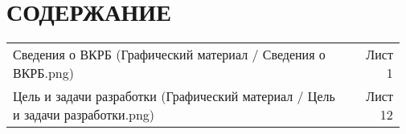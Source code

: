 \newpage
\section*{СОДЕРЖАНИЕ}
\tableofcontents
\vspace{3pt}
{\parindent0pt
\begin{tabular}{@{}p{0.85\linewidth}r{0.124\linewidth}}
Сведения о ВКРБ (Графический материал / Сведения о ВКРБ.png) & Лист 1\\
Цель и задачи разработки (Графический материал / Цель
и задачи разработки.png) & Лист 12\\
\end{tabular}
}
